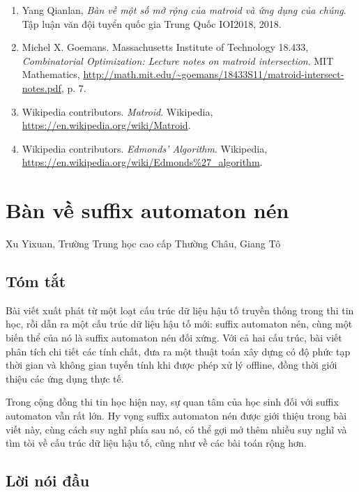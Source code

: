 \documentclass[11pt]{article}
\begin{document}
\begin{enumerate}
  \item Yang Qianlan, \emph{Bàn về một số mở rộng của matroid và ứng dụng của
  chúng}. Tập luận văn đội tuyển quốc gia Trung Quốc IOI2018, 2018.
  \item Michel X. Goemans. Massachusetts Institute of Technology 18.433,
  \emph{Combinatorial Optimization: Lecture notes on matroid intersection}. MIT
  Mathematics,
  \url{http://math.mit.edu/~goemans/18433S11/matroid-intersect-notes.pdf}, p. 7.
  \item Wikipedia contributors. \emph{Matroid}. Wikipedia,
  \url{https://en.wikipedia.org/wiki/Matroid}.
  \item Wikipedia contributors. \emph{Edmonds' Algorithm}. Wikipedia,
  \url{https://en.wikipedia.org/wiki/Edmonds%27_algorithm}.
\end{enumerate}

\section{Bàn về suffix automaton nén}

\begin{center}
Xu Yixuan, Trường Trung học cao cấp Thường Châu, Giang Tô
\end{center}

\subsection*{Tóm tắt}

Bài viết xuất phát từ một loạt cấu trúc dữ liệu hậu tố truyền thống trong thi
tin học, rồi dẫn ra một cấu trúc dữ liệu hậu tố mới: suffix automaton nén, cùng
một biến thể của nó là suffix automaton nén đối xứng. Với cả hai cấu trúc, bài
viết phân tích chi tiết các tính chất, đưa ra một thuật toán xây dựng có độ
phức tạp thời gian và không gian tuyến tính khi được phép xử lý offline, đồng
thời giới thiệu các ứng dụng thực tế.

Trong cộng đồng thi tin học hiện nay, sự quan tâm của học sinh đối với suffix
automaton vẫn rất lớn. Hy vọng suffix automaton nén được giới thiệu trong bài
viết này, cùng cách suy nghĩ phía sau nó, có thể gợi mở thêm nhiều suy nghĩ và
tìm tòi về cấu trúc dữ liệu hậu tố, cũng như về các bài toán rộng hơn.

\subsection{Lời nói đầu}
\end{document}
